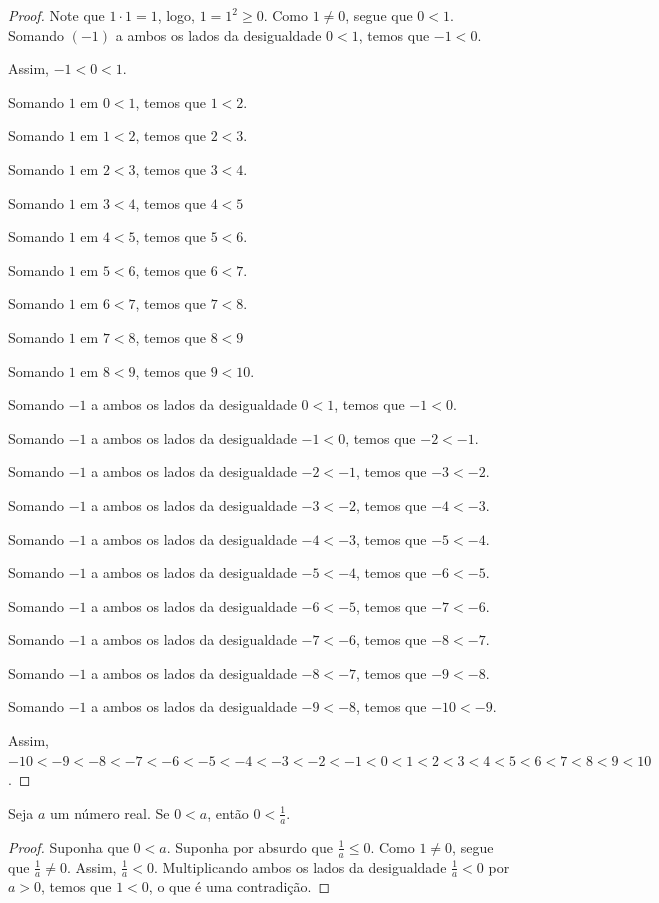 \begin{proof}
    Note que $1\cdot 1=1$, logo, $1=1^2\geq 0$.
    Como $1\neq 0$, segue que $0<1$.
    Somando $(-1)$ a ambos os lados da desigualdade $0<1$, temos que $-1<0$.

    Assim, $-1<0<1$.

    Somando $1$ em $0<1$, temos que $1<2$.

    Somando $1$ em $1<2$, temos que $2<3$.

    Somando $1$ em $2<3$, temos que $3<4$.

    Somando $1$ em $3<4$, temos que $4<5$

    Somando $1$ em $4<5$, temos que $5<6$.

    Somando $1$ em $5<6$, temos que $6<7$.

    Somando $1$ em $6<7$, temos que $7<8$.

    Somando $1$ em $7<8$, temos que $8<9$

    Somando $1$ em $8<9$, temos que $9<10$.

    Somando $-1$ a ambos os lados da desigualdade $0<1$, temos que $-1<0$.

    Somando $-1$ a ambos os lados da desigualdade $-1<0$, temos que $-2<-1$.

    Somando $-1$ a ambos os lados da desigualdade $-2<-1$, temos que $-3<-2$.

    Somando $-1$ a ambos os lados da desigualdade $-3<-2$, temos que $-4<-3$.

    Somando $-1$ a ambos os lados da desigualdade $-4<-3$, temos que $-5<-4$.

    Somando $-1$ a ambos os lados da desigualdade $-5<-4$, temos que $-6<-5$.

    Somando $-1$ a ambos os lados da desigualdade $-6<-5$, temos que $-7<-6$.

    Somando $-1$ a ambos os lados da desigualdade $-7<-6$, temos que $-8<-7$.

    Somando $-1$ a ambos os lados da desigualdade $-8<-7$, temos que $-9<-8$.

    Somando $-1$ a ambos os lados da desigualdade $-9<-8$, temos que $-10<-9$.

    Assim, $-10<-9<-8<-7<-6<-5<-4<-3<-2<-1<0<1<2<3<4<5<6<7<8<9<10$.
\end{proof}

\begin{proposition}
    Seja $a$ um número real.
    Se $0<a$, então $0<\frac{1}{a}$.
\end{proposition}
\begin{proof}
    Suponha que $0<a$.
    Suponha por absurdo que $\frac{1}{a}\leq 0$.
    Como $1\neq 0$, segue que $\frac{1}{a}\neq 0$.
    Assim, $\frac{1}{a}<0$.
    Multiplicando ambos os lados da desigualdade $\frac{1}{a}<0$ por $a>0$, temos que $1<0$, o que é uma contradição.
\end{proof}

